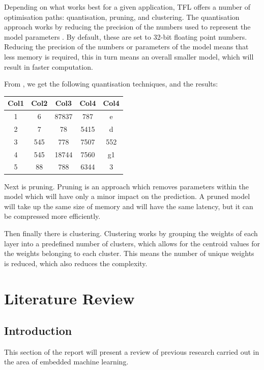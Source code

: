 \documentclass[conference]{IEEEtran}
\begin{document}
Depending on what works best for a given application, TFL offers a number of optimisation paths: quantisation, pruning, and clustering. The quantisation approach works by reducing the precision of the numbers used to represent the model parameters \cite{tfl2}. By default, these are set to 32-bit floating point numbers. Reducing the precision of the numbers or parameters of the model means that less memory is required, this in turn means an overall smaller model, which will result in faster computation.

From \cite{tfl1}, we get the following quantisation techniques, and the results:

\begin{tabular}{||c c c c c||} 
 \hline
 Col1 & Col2 & Col3 & Col4 & Col4 \\ [1.0ex] 
 \hline\hline
 1 & 6 & 87837 & 787 & e\\ 
 \hline
 2 & 7 & 78 & 5415 & d \\
 \hline
 3 & 545 & 778 & 7507 & 552\\
 \hline
 4 & 545 & 18744 & 7560 & g1 \\
 \hline
 5 & 88 & 788 & 6344 & 3\\ [1ex] 
 \hline
\end{tabular}


Next is pruning. Pruning is an approach which removes parameters within the model which will have only a minor impact on the prediction. A pruned model will take up the same size of memory and will have the same latency, but it can be compressed more efficiently.

Then finally there is clustering. Clustering works by grouping the weights of each layer into a predefined number of clusters, which allows for the centroid values for the weights belonging to each cluster. This means the number of unique weights is reduced, which also reduces the complexity.

\section{Literature Review}
\subsection{Introduction}
This section of the report will present a review of previous research carried out in the area of embedded machine learning.
\end{document}
